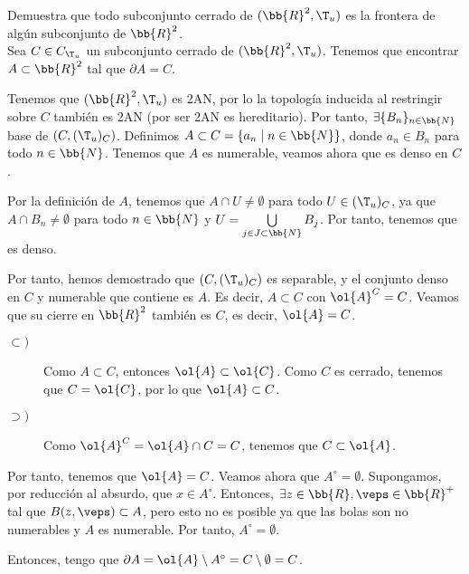 \begin{ejercicio}
    Demuestra que todo subconjunto cerrado de $(\bb{R}^2, \T_u)$ es la frontera de algún subconjunto de $\bb{R}^2$.\\

    Sea $C\in C_{\T_u}$ un subconjunto cerrado de $(\bb{R}^2, \T_u)$. Tenemos que encontrar $A\subset  \bb{R}^2$ tal que $\partial A=C$.

    Tenemos que $(\bb{R}^2, \T_u)$ es 2AN, por lo la topología inducida al restringir sobre $C$ también es 2AN (por ser 2AN es hereditario). Por tanto, $\exists \{B_n\}_{n\in \bb{N}}$ base de $\left(C,(\T_u)_C\right)$. Definimos $A\subset C=\{a_n\mid n\in \bb{N}\}$, donde $a_n\in B_n$ para todo $n\in \bb{N}$. Tenemos que $A$ es numerable, veamos ahora que es denso en $C$.

    Por la definición de $A$, tenemos que $A\cap U\neq \emptyset$ para todo $U\in (\T_u)_C$, ya que $A\cap B_n\neq \emptyset$ para todo $n\in \bb{N}$ y $U=\bigcup\limits_{j\in J\subset \bb{N}}B_j$. Por tanto, tenemos que es denso.

    Por tanto, hemos demostrado que $\left(C,(\T_u)_C\right)$ es separable, y el conjunto denso en $C$ y numerable que contiene es $A$. Es decir, $A\subset C$ con $\ol{A}^C=C$. Veamos que su cierre en $\bb{R}^2$ también es $C$, es decir, $\ol{A}=C$.
    \begin{description}
        \item[$\subset)$] Como $A\subset C$, entonces $\ol{A}\subset \ol{C}$. Como $C$ es cerrado, tenemos que $C=\ol{C}$, por lo que $\ol{A}\subset C$.
        \item[$\supset)$]
        Como $\ol{A}^C=\ol{A}\cap C=C$, tenemos que $C\subset \ol{A}$.
    \end{description}
    
    Por tanto, tenemos que $\ol{A}= C$. Veamos ahora que $A^\circ = \emptyset$.
    Supongamos, por reducción al absurdo, que $x\in A^\circ$. Entonces, $\exists z\in \bb{R},\veps\in \bb{R}^+$ tal que $B(z,\veps)\subset A$, pero esto no es posible ya que las bolas son no numerables y $A$ es numerable. Por tanto, $A^\circ = \emptyset$.

    Entonces, tengo que $\partial A = \ol{A}\setminus A^\circ = C\setminus \emptyset = C$.
\end{ejercicio}

